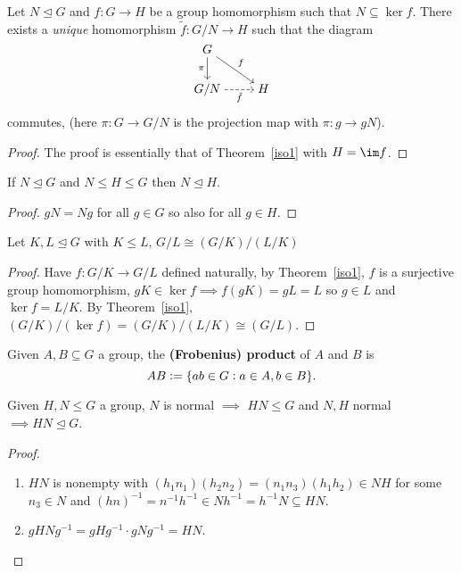 \documentclass[../Year2.tex]{subfiles}
\begin{document}
\begin{theorem}
    Let $N\unlhd G$ and $f:G\rightarrow H$ be a group homomorphism such that $N\subseteq \ker f$. There exists a \textit{unique} homomorphism $\tilde{f}:G/N\rightarrow H$ such that the diagram \[
        \begin{tikzcd}[cramped]
            G \arrow[d, swap, "\pi"] \arrow[rd, "f"]\\
            G/N \arrow[r, dashed, swap, "\tilde{f}"] & H
        \end{tikzcd}
    \] commutes, (here $\pi:G\rightarrow G/N$ is the projection map with $\pi:g\rightarrow gN$).

    \begin{proof}
        The proof is essentially that of Theorem~\ref{iso1} with $H=\im f$.
    \end{proof}
\end{theorem}

\begin{lemma}
    If $N\unlhd G$ and $N\leq H\leq G$ then $N\unlhd H$.
    \begin{proof}
        $gN=Ng$ for all $g\in G$ so also for all $g\in H$.
    \end{proof}
\end{lemma}

\begin{theorem}
    Let $K,L\unlhd G$ with $K\leq L$, $G/L\cong (G/K)/(L/K)$

    \begin{proof}
        Have $f:G/K\rightarrow G/L$ defined naturally, by Theorem~\ref{iso1}, $f$ is a surjective group homomorphism, $gK\in \ker f\implies f(gK)=gL=L$ so $g\in L$ and $\ker f = L/K$. By Theorem~\ref{iso1}, $(G/K)/(\ker  f) = (G/K)/(L/K)\cong (G/L)$. 
    \end{proof}
\end{theorem}

\begin{definition}
    Given $A,B\subseteq G$ a group, the \textbf{(Frobenius) product} of $A$ and $B$ is \[
        AB := \{ab\in G: a\in A, b\in B\}
    \text{\textcolor{black}{.}}
    \]
    \vspace{-20pt}
\end{definition}

\begin{lemma}
    Given $H,N\leq G$ a group, $N$ is normal $\implies$ $HN\leq G$ and $N,H$ normal $\implies HN\unlhd G$.
    \begin{proof}
        \begin{enumerate}
            \item $HN$ is nonempty with $(h_1n_1)(h_2n_2)=(n_1n_3)(h_1h_2)\in NH$ for some $n_3\in N$ and $(hn)^{-1}=n^{-1}h^{-1}\in Nh^{-1} = h^{-1}N\subseteq HN$.
            \item $gHNg^{-1} = gHg^{-1} \cdot gNg^{-1} = HN$.
        \end{enumerate}
    \vspace{-15pt}
    \end{proof}
\end{lemma}
\end{document}
